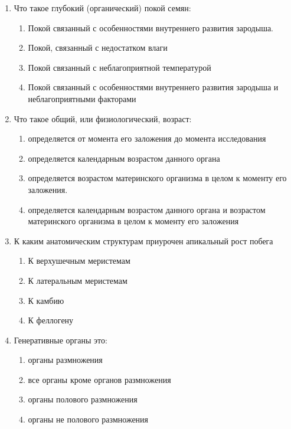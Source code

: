 \begin{enumerate}

\item  Что такое глубокий (органический) покой семян:
\begin{enumerate}
	\item  Покой связанный с особенностями внутреннего развития зародыша.
	\item  Покой, связанный с недостатком влаги
	\item  Покой связанный с неблагоприятной температурой
	\item  Покой связанный с особенностями внутреннего развития зародыша и неблагоприятными факторами
\end{enumerate}

\item Что такое общий, или физиологический, возраст:
\begin{enumerate}
	\item определяется от момента его заложения до момента исследования
	\item определяется календарным возрастом данного органа 
	\item определяется возрастом материнского организма в целом к моменту его заложения.
	\item определяется календарным возрастом данного органа и возрастом материнского организма в целом к моменту его заложения
\end{enumerate}

\item К каким анатомическим структурам приурочен апикальный рост побега
\begin{enumerate}
	\item К верхушечным меристемам        
	\item К латеральным меристемам
	\item К камбию                                        
	\item К феллогену
\end{enumerate}

\item Генеративные органы это:
\begin{enumerate}
	\item органы размножения                  
	\item все органы кроме органов размножения
	\item органы полового размножения  
	\item органы не полового размножения
\end{enumerate}


\end{enumerate}
